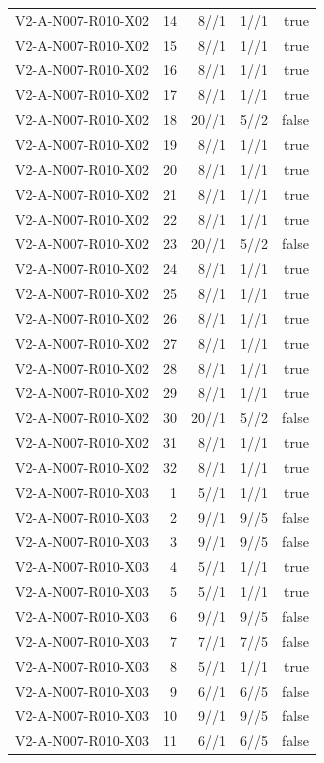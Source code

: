 {\begin{longtable}{lrrrr}
V2-A-N007-R010-X02 & 14 & 8//1 & 1//1 & true \\
V2-A-N007-R010-X02 & 15 & 8//1 & 1//1 & true \\
V2-A-N007-R010-X02 & 16 & 8//1 & 1//1 & true \\
V2-A-N007-R010-X02 & 17 & 8//1 & 1//1 & true \\
V2-A-N007-R010-X02 & 18 & 20//1 & 5//2 & false \\
V2-A-N007-R010-X02 & 19 & 8//1 & 1//1 & true \\
V2-A-N007-R010-X02 & 20 & 8//1 & 1//1 & true \\
V2-A-N007-R010-X02 & 21 & 8//1 & 1//1 & true \\
V2-A-N007-R010-X02 & 22 & 8//1 & 1//1 & true \\
V2-A-N007-R010-X02 & 23 & 20//1 & 5//2 & false \\
V2-A-N007-R010-X02 & 24 & 8//1 & 1//1 & true \\
V2-A-N007-R010-X02 & 25 & 8//1 & 1//1 & true \\
V2-A-N007-R010-X02 & 26 & 8//1 & 1//1 & true \\
V2-A-N007-R010-X02 & 27 & 8//1 & 1//1 & true \\
V2-A-N007-R010-X02 & 28 & 8//1 & 1//1 & true \\
V2-A-N007-R010-X02 & 29 & 8//1 & 1//1 & true \\
V2-A-N007-R010-X02 & 30 & 20//1 & 5//2 & false \\
V2-A-N007-R010-X02 & 31 & 8//1 & 1//1 & true \\
V2-A-N007-R010-X02 & 32 & 8//1 & 1//1 & true \\
V2-A-N007-R010-X03 & 1 & 5//1 & 1//1 & true \\
V2-A-N007-R010-X03 & 2 & 9//1 & 9//5 & false \\
V2-A-N007-R010-X03 & 3 & 9//1 & 9//5 & false \\
V2-A-N007-R010-X03 & 4 & 5//1 & 1//1 & true \\
V2-A-N007-R010-X03 & 5 & 5//1 & 1//1 & true \\
V2-A-N007-R010-X03 & 6 & 9//1 & 9//5 & false \\
V2-A-N007-R010-X03 & 7 & 7//1 & 7//5 & false \\
V2-A-N007-R010-X03 & 8 & 5//1 & 1//1 & true \\
V2-A-N007-R010-X03 & 9 & 6//1 & 6//5 & false \\
V2-A-N007-R010-X03 & 10 & 9//1 & 9//5 & false \\
V2-A-N007-R010-X03 & 11 & 6//1 & 6//5 & false \\

\end{longtable}}
